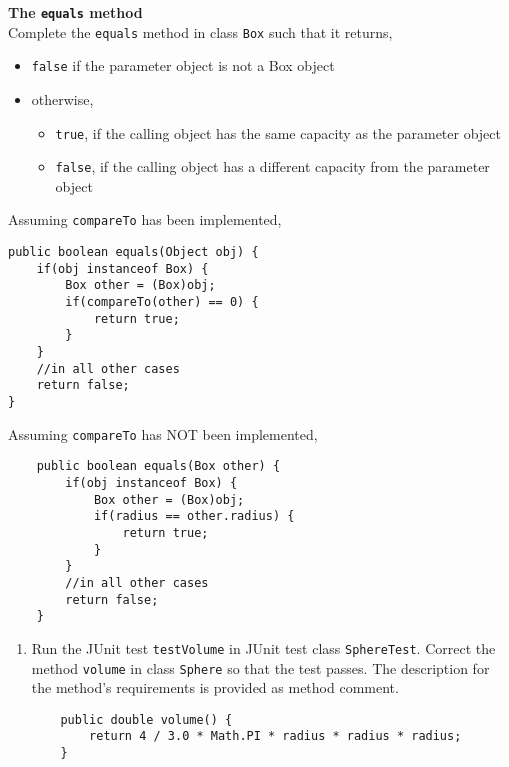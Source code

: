 \begin{questions}
\question \textbf{The \texttt{equals} method}\\
Complete the \texttt{equals} method in class \texttt{Box} such that it returns,

\begin{itemize}
\item \texttt{false} if the parameter object is not a Box object
\item otherwise,
	\begin{itemize}
	\item \texttt{true}, if the calling object has the same capacity as the parameter object
	\item \texttt{false}, if the calling object has a different capacity from the parameter object
	\end{itemize}
\end{itemize}

\begin{solution}
Assuming \texttt{compareTo} has been implemented,
\begin{lstlisting}
public boolean equals(Object obj) {
	if(obj instanceof Box) {
		Box other = (Box)obj;
		if(compareTo(other) == 0) {
			return true;
		}
	}
	//in all other cases
	return false;
}
\end{lstlisting}

Assuming \texttt{compareTo} has NOT been implemented,
\begin{lstlisting}
	public boolean equals(Box other) {
		if(obj instanceof Box) {
			Box other = (Box)obj;
			if(radius == other.radius) {
				return true;
			}
		}
		//in all other cases
		return false;	
	}
\end{lstlisting}
\end{solution}


\begin{enumerate}
\item Run the JUnit test \texttt{testVolume} in JUnit test class \texttt{SphereTest}. Correct the method \texttt{volume} in class \texttt{Sphere} so that the test passes. The description for the method's requirements is provided as method comment.

\begin{solution}
\begin{lstlisting}
	public double volume() {
		return 4 / 3.0 * Math.PI * radius * radius * radius;
	}
\end{lstlisting}
\end{solution}
\end{enumerate}


\end{questions}
